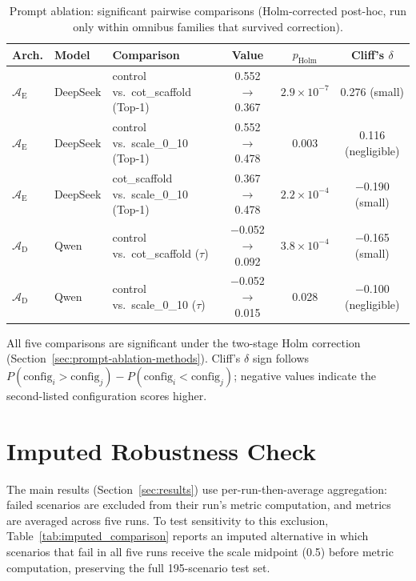 \documentclass[final,3p,times]{elsarticle}
\begin{document}
\begin{table}[t]
\begin{threeparttable}
\small
\centering
\renewcommand{\arraystretch}{1.10}
\caption{Prompt ablation: significant pairwise comparisons (Holm-corrected post-hoc, run only within omnibus families that survived correction).}
\label{tab:prompt_pairwise}
\begin{tabular}{@{}ll l ccc@{}}
\toprule
Arch. & Model & Comparison & Value & $p_{\text{Holm}}$ & Cliff's $\delta$ \\
\midrule
$\mathcal{A}_{\text{E}}$ & DeepSeek & control vs.\ cot\_scaffold (Top-1) & 0.552 $\to$ 0.367 & $2.9\times10^{-7}$ & 0.276 (small) \\
$\mathcal{A}_{\text{E}}$ & DeepSeek & control vs.\ scale\_0\_10 (Top-1) & 0.552 $\to$ 0.478 & 0.003 & 0.116 (negligible) \\
$\mathcal{A}_{\text{E}}$ & DeepSeek & cot\_scaffold vs.\ scale\_0\_10 (Top-1) & 0.367 $\to$ 0.478 & $2.2\times10^{-4}$ & $-$0.190 (small) \\
$\mathcal{A}_{\text{D}}$ & Qwen & control vs.\ cot\_scaffold ($\tau$) & $-$0.052 $\to$ 0.092 & $3.8\times10^{-4}$ & $-$0.165 (small) \\
$\mathcal{A}_{\text{D}}$ & Qwen & control vs.\ scale\_0\_10 ($\tau$) & $-$0.052 $\to$ 0.015 & 0.028 & $-$0.100 (negligible) \\
\bottomrule
\end{tabular}
\renewcommand{\arraystretch}{1.0}
\begin{tablenotes}
\item All five comparisons are significant under the two-stage Holm correction (Section~\ref{sec:prompt-ablation-methods}). Cliff's $\delta$ sign follows $P(\text{config}_i > \text{config}_j) - P(\text{config}_i < \text{config}_j)$; negative values indicate the second-listed configuration scores higher.
\end{tablenotes}
\end{threeparttable}
\end{table}

\section{Imputed Robustness Check}
\label{app:imputed}

The main results (Section~\ref{sec:results}) use per-run-then-average aggregation: failed scenarios are excluded from their run's metric computation, and metrics are averaged across five runs. To test sensitivity to this exclusion, Table~\ref{tab:imputed_comparison} reports an imputed alternative in which scenarios that fail in all five runs receive the scale midpoint (0.5) before metric computation, preserving the full 195-scenario test set.
\end{document}
